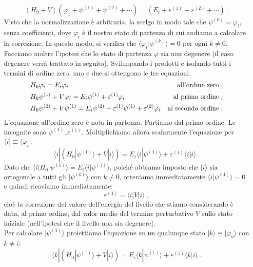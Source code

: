 \documentclass[12pt,a4paper]{report}
\theoremstyle{definition}
\numberwithin{equation}{section}
\newcommand{\bra}{\langle}
\newcommand{\ket}{\rangle}
\begin{document}
\begin{equation}
(H_0+V)(\varphi_1+\psi^{(1)}+\psi^{(2)}+\cdots)=(E_i+\varepsilon^{(1)}+\varepsilon^{(2)}+\cdots)\;.
\end{equation}
Visto che la normalizzazione è arbitraria, la scelgo in modo tale che $\psi^{(0)}=\varphi_i$, senza coefficienti, dove $\varphi_i$ è il nostro stato di partenza di cui andiamo a calcolare la correzione. In questo modo, si verifica che $\bra\varphi_i|\psi^{(k)}\ket=0$ per ogni $k\ne 0$. Facciamo inoltre l'ipotesi che lo stato di partenza $\varphi$ sia non degenere (il caso degenere verrà trattato in seguito). Sviluppando i prodotti e isolando tutti i termini di ordine zero, uno e due si ottengono le tre equazioni:
\begin{align}
&H_0\varphi_i = E_i\varphi_i &\mbox{all'ordine zero}\;, \notag \\
&H_0\psi^{(1)}+V\varphi_i = E_i\psi^{(1)}+\varepsilon^{(1)}\varphi_i &\mbox{al primo ordine} \notag\;, \\
&H_0\psi^{(2)}+V\psi^{(1)} = E_i\psi^{(2)}+\varepsilon^{(1)}\psi^{(1)}+\varepsilon^{(2)}\varphi_i &\mbox{al secondo ordine}\;.
\end{align}
L'equazione all'ordine zero è nota in partenza. Partiamo dal primo ordine. Le incognite sono $\psi^{(1)},\varepsilon^{(1)}$. Moltiplichiamo allora scalarmente l'equazione per $\bra i|\equiv \bra \varphi_i|$:
\begin{equation}
\bra i|\left(H_0|\psi^{(1)}\ket+V|i\ket\right)=E_i\bra i|\psi^{(1)}\ket+\varepsilon^{(1)}\bra i|i\ket\;.
\end{equation}
Dato che $\bra i|H_0|\psi^{(1)}\ket=E_i\bra i|\psi^{(1)}\ket$, poiché abbiamo imposto che $|i\ket$ sia ortogonale a tutti gli $|\psi^{(k)}\ket$ con $k\ne 0$, otteniamo immediatamente $\bra i|\psi^{(1)}\ket=0$ e quindi ricaviamo immediatamente:
\begin{equation}
\varepsilon^{(1)}=\bra i|V|i\ket\;,
\end{equation}
cioè la correzione del valore dell'energia del livello che stiamo considerando è data, al primo ordine, dal valor medio del termine perturbativo $V$ sullo stato iniziale (nell'ipotesi che il livello non sia degenere). \\
Per calcolare $|\psi^{(1)}\ket$ proiettiamo l'equazione su un qualunque stato $|k\ket\equiv |\varphi_k\ket$ con $k\ne i$:
\begin{equation*}
\bra k|\left(H_0|\psi^{(1)}\ket+V|i\ket\right)=E_i\bra k|\psi^{(1)}\ket+\varepsilon^{(1)}\bra k|i\ket\;.
\end{equation*}
\end{document}
